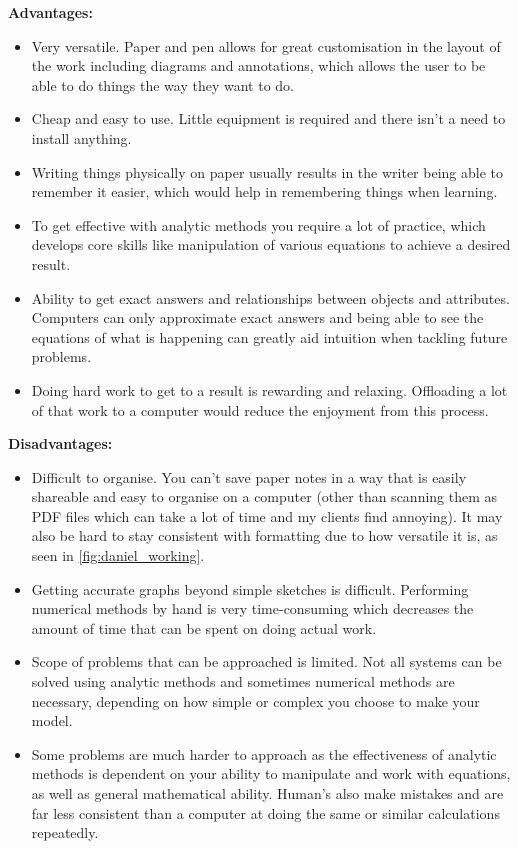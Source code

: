 \documentclass[tikz, 11pt]{article}
\begin{document}
                \newpage
                \textbf{Advantages:}
                \begin{itemize}
                    \item Very versatile. Paper and pen allows for great customisation in the layout of the work including diagrams and annotations, which allows the user to be able to do things the way they want to do.
                    \item Cheap and easy to use. Little equipment is required and there isn't a need to install anything. 
                    \item Writing things physically on paper usually results in the writer being able to remember it easier, which would help in remembering things when learning. 
                    \item To get effective with analytic methods you require a lot of practice, which develops core skills like manipulation of various equations to achieve a desired result.
                    \item Ability to get exact answers and relationships between objects and attributes. Computers can only approximate exact answers and being able to see the equations of what is happening can greatly aid intuition when tackling future problems.
                    \item Doing hard work to get to a result is rewarding and relaxing. Offloading a lot of that work to a computer would reduce the enjoyment from this process.
                \end{itemize}

                \textbf{Disadvantages:}
                \begin{itemize}
                    \item Difficult to organise. You can't save paper notes in a way that is easily shareable and easy to organise on a computer (other than scanning them as PDF files which can take a lot of time and my clients find annoying). It may also be hard to stay consistent with formatting due to how versatile it is, as seen in \autoref{fig:daniel_working}.
                    \item Getting accurate graphs beyond simple sketches is difficult. Performing numerical methods by hand is very time-consuming which decreases the amount of time that can be spent on doing actual work. 
                    \item Scope of problems that can be approached is limited. Not all systems can be solved using analytic methods and sometimes numerical methods are necessary, depending on how simple or complex you choose to make your model.
                    \item Some problems are much harder to approach as the effectiveness of analytic methods is dependent on your ability to manipulate and work with equations, as well as general mathematical ability. Human's also make mistakes and are far less consistent than a computer at doing the same or similar calculations repeatedly.
                \end{itemize}
\end{document}

